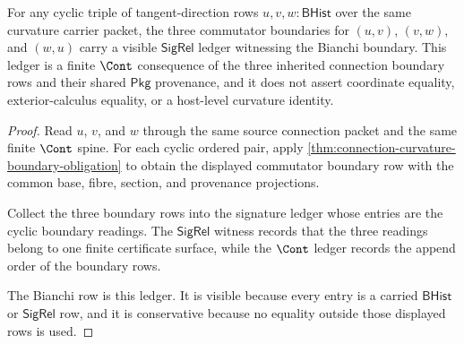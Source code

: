 \begin{theorem}
\label{thm:curvature-bianchi-ledger-row}
For any cyclic triple of tangent-direction rows $u,v,w:\mathsf{BHist}$ over the same curvature carrier packet, the three commutator boundaries for $(u,v)$, $(v,w)$, and $(w,u)$ carry a visible $\mathsf{SigRel}$ ledger witnessing the Bianchi boundary. This ledger is a finite $\Cont$ consequence of the three inherited connection boundary rows and their shared $\mathsf{Pkg}$ provenance, and it does not assert coordinate equality, exterior-calculus equality, or a host-level curvature identity.
\end{theorem}
\begin{proof}
Read $u$, $v$, and $w$ through the same source connection packet and the same finite $\Cont$ spine. For each cyclic ordered pair, apply \autoref{thm:connection-curvature-boundary-obligation} to obtain the displayed commutator boundary row with the common base, fibre, section, and provenance projections.

Collect the three boundary rows into the signature ledger whose entries are the cyclic boundary readings. The $\mathsf{SigRel}$ witness records that the three readings belong to one finite certificate surface, while the $\Cont$ ledger records the append order of the boundary rows.

The Bianchi row is this ledger. It is visible because every entry is a carried $\mathsf{BHist}$ or $\mathsf{SigRel}$ row, and it is conservative because no equality outside those displayed rows is used.
\end{proof}

